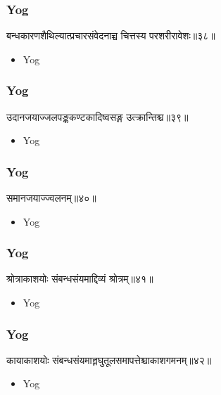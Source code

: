 \begin{frame}[fragile]\frametitle{Yog}
\begin{sanskrit}
बन्धकारणशैथिल्यात्प्रचारसंवेदनाच्च चित्तस्य परशरीरावेशः॥३८॥
\end{sanskrit}
	\begin{itemize}
	\item Yog 
	\end{itemize}
\end{frame}


\begin{frame}[fragile]\frametitle{Yog}
\begin{sanskrit}
उदानजयाज्जलपङ्ककण्टकादिष्वसङ्ग उत्क्रान्तिश्च॥३९॥
\end{sanskrit}
	\begin{itemize}
	\item Yog 
	\end{itemize}
\end{frame}

\begin{frame}[fragile]\frametitle{Yog}
\begin{sanskrit}
समानजयाज्ज्वलनम्॥४०॥
\end{sanskrit}
	\begin{itemize}
	\item Yog 
	\end{itemize}
\end{frame}

\begin{frame}[fragile]\frametitle{Yog}
\begin{sanskrit}
श्रोत्राकाशयोः संबन्धसंयमाद्दिव्यं श्रोत्रम्॥४१॥
\end{sanskrit}
	\begin{itemize}
	\item Yog 
	\end{itemize}
\end{frame}


\begin{frame}[fragile]\frametitle{Yog}
\begin{sanskrit}
कायाकाशयोः संबन्धसंयमाल्लघुतूलसमापत्तेश्चाकाशगमनम्॥४२॥
\end{sanskrit}
	\begin{itemize}
	\item Yog 
	\end{itemize}
\end{frame}

